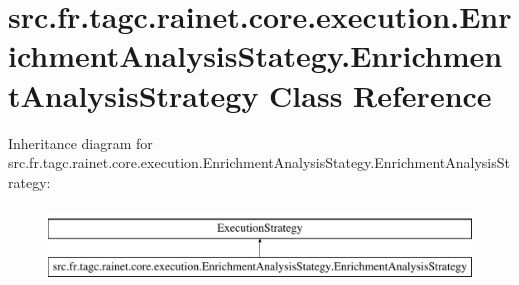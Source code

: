 \hypertarget{classsrc_1_1fr_1_1tagc_1_1rainet_1_1core_1_1execution_1_1EnrichmentAnalysisStategy_1_1EnrichmentAnalysisStrategy}{\section{src.\-fr.\-tagc.\-rainet.\-core.\-execution.\-Enrichment\-Analysis\-Stategy.\-Enrichment\-Analysis\-Strategy Class Reference}
\label{classsrc_1_1fr_1_1tagc_1_1rainet_1_1core_1_1execution_1_1EnrichmentAnalysisStategy_1_1EnrichmentAnalysisStrategy}
}
Inheritance diagram for src.\-fr.\-tagc.\-rainet.\-core.\-execution.\-Enrichment\-Analysis\-Stategy.\-Enrichment\-Analysis\-Strategy\-:\begin{figure}[H]
\begin{center}
\leavevmode
\includegraphics[height=2.000000cm]{classsrc_1_1fr_1_1tagc_1_1rainet_1_1core_1_1execution_1_1EnrichmentAnalysisStategy_1_1EnrichmentAnalysisStrategy}
\end{center}
\end{figure}

